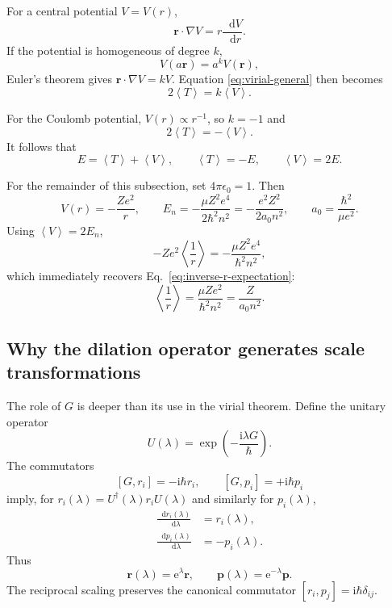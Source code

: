 \documentclass[11pt]{article}
\newcommand{\dd}{\mathop{}\!\mathrm{d}}
\newcommand{\ee}{\mathrm{e}}
\newcommand{\ii}{\mathrm{i}}
\newcommand{\avg}[1]{\left\langle #1\right\rangle}
\newcommand{\comm}[2]{\left[#1,#2\right]}
\newcommand{\vect}[1]{\bm{#1}}
\begin{document}
For a central potential $V=V(r)$,
\begin{equation}
  \vect{r}\cdot\nabla V=r\frac{\dd V}{\dd r}.
\end{equation}
If the potential is homogeneous of degree $k$,
\begin{equation}
  V(a\vect{r})=a^kV(\vect{r}),
\end{equation}
Euler's theorem gives $\vect{r}\cdot\nabla V=kV$.  Equation
\eqref{eq:virial-general} then becomes
\begin{equation}
  \boxed{2\avg{T}=k\avg{V}}.
\end{equation}

For the Coulomb potential, $V(r)\propto r^{-1}$, so $k=-1$ and
\begin{equation}
  \boxed{2\avg{T}=-\avg{V}}.
\end{equation}
It follows that
\begin{equation}
  E=\avg{T}+\avg{V},
  \qquad
  \boxed{\avg{T}=-E},
  \qquad
  \boxed{\avg{V}=2E}.
\end{equation}

For the remainder of this subsection, set $4\pi\epsilon_0=1$.  Then
\begin{equation}
  V(r)=-\frac{Ze^2}{r},
  \qquad
  E_n=-\frac{\mu Z^2e^4}{2\hbar^2n^2}
      =-\frac{e^2Z^2}{2a_0n^2},
  \qquad
  a_0=\frac{\hbar^2}{\mu e^2}.
\end{equation}
Using $\avg{V}=2E_n$,
\begin{equation}
  -Ze^2\avg{\frac{1}{r}}
  =-\frac{\mu Z^2e^4}{\hbar^2n^2},
\end{equation}
which immediately recovers Eq.~\eqref{eq:inverse-r-expectation}:
\begin{equation}
  \boxed{
  \avg{\frac{1}{r}}=\frac{\mu Ze^2}{\hbar^2n^2}
  =\frac{Z}{a_0n^2}
  }.
\end{equation}

\subsection{Why the dilation operator generates scale transformations}

The role of $G$ is deeper than its use in the virial theorem.  Define the unitary
operator
\begin{equation}
  U(\lambda)=\exp\left(-\frac{\ii\lambda G}{\hbar}\right).
\end{equation}
The commutators
\begin{equation}
  \comm{G}{r_i}=-\ii\hbar r_i,
  \qquad
  \comm{G}{p_i}=+\ii\hbar p_i
\end{equation}
imply, for $r_i(\lambda)=U^{\dagger}(\lambda)r_iU(\lambda)$ and similarly for
$p_i(\lambda)$,
\begin{align}
  \frac{\dd r_i(\lambda)}{\dd\lambda}&=r_i(\lambda),\\
  \frac{\dd p_i(\lambda)}{\dd\lambda}&=-p_i(\lambda).
\end{align}
Thus
\begin{equation}
  \boxed{
  \vect{r}(\lambda)=\ee^{\lambda}\vect{r},
  \qquad
  \vect{p}(\lambda)=\ee^{-\lambda}\vect{p}
  }.
\end{equation}
The reciprocal scaling preserves the canonical commutator
$\comm{r_i}{p_j}=\ii\hbar\delta_{ij}$.
\end{document}
